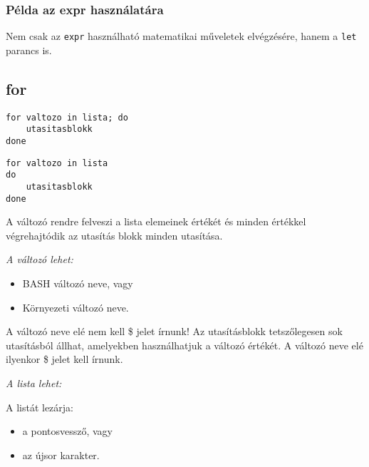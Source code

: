 \subsubsection*{Példa az expr használatára}
Nem csak az \texttt{expr} használható matematikai műveletek elvégzésére, hanem a \texttt{let} parancs is.



\subsection{for}

\begin{minipage}{0.4\textwidth}
\lstset{linewidth=\textwidth}
\begin{lstlisting}
for valtozo in lista; do
	utasitasblokk
done
\end{lstlisting}
\end{minipage}
\hfill
\begin{minipage}{0.4\textwidth}\lstset{linewidth=\textwidth}
\begin{lstlisting}
for valtozo in lista
do
	utasitasblokk
done
\end{lstlisting}
\end{minipage}


A változó rendre felveszi a lista elemeinek értékét és minden értékkel végrehajtódik az
utasítás blokk minden utasítása.\smallskip

\emph{A változó lehet:}
\begin{itemize}
\item BASH változó neve, vagy
\item Környezeti változó neve.
\end{itemize}

A változó neve elé nem kell \$ jelet írnunk!  Az utasításblokk tetszőlegesen sok utasításból állhat, 
amelyekben használhatjuk a változó értékét. A változó neve elé ilyenkor \$ jelet kell írnunk.
\smallskip

\emph{A lista lehet:}
A listát lezárja:
\begin{itemize}
\item a pontosvessző, vagy
\item az újsor karakter.
\end{itemize}


